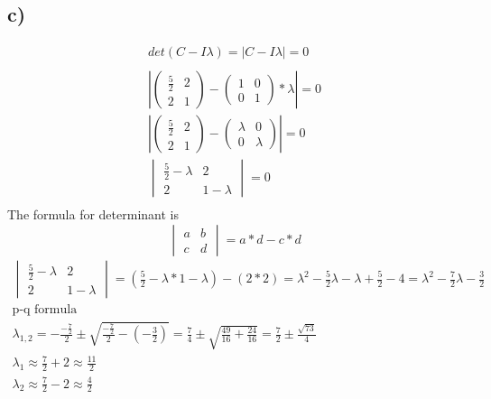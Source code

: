 \documentclass[12pt]{article}
\begin{document}
\subsection{c)}
\begin{gather*}
    det(C - I\lambda) = |C - I\lambda |= 0  \\
    \\
    \left|
    \begin{pmatrix}
        \frac{5}{2} & 2 \\
        2 & 1 
    \end{pmatrix}
    -
    \begin{pmatrix}
        1 & 0 \\
        0 & 1 
    \end{pmatrix}
    * \lambda \right| = 0 
\\
    \left|
    \begin{pmatrix}
        \frac{5}{2} & 2 \\
        2 & 1 
    \end{pmatrix}
    -
    \begin{pmatrix}
        \lambda & 0 \\
        0 & \lambda 
    \end{pmatrix}
    \right| = 0 
    \\
    \begin{vmatrix}
        \frac{5}{2} - \lambda & 2 \\
        2 & 1 -\lambda
    \end{vmatrix}
    = 0 \\
\end{gather*}
The formula for determinant is $$ 
\begin{vmatrix}
    a & b \\
    c & d 
\end{vmatrix}
= a * d - c * d $$
\begin{gather*}
    \begin{vmatrix}
        \frac{5}{2} - \lambda & 2 \\
        2 & 1 -\lambda
    \end{vmatrix}
    =(\frac{5}{2} - \lambda * 1 - \lambda) - (2 * 2) =\lambda^2 - \frac{5}{2}\lambda - \lambda + \frac{5}{2} - 4 =  \lambda^2 -\frac{7}{2}\lambda -\frac{3}{2} \\
    \text{p-q formula} \\
    \lambda_{1,2} =  -\frac{-\frac{7}{2}}{2} \pm \sqrt{\frac{-\frac{7}{2}}{2} - (-\frac{3}{2})} = \frac{7}{4} \pm \sqrt{\frac{49}{16}+ \frac{24}{16}} = \frac{7}{2} \pm \frac{\sqrt{73}}{4} \\
    \lambda_1 \approx \frac{7}{2} + 2 \approx \frac{11}{2} \\
    \lambda_2 \approx \frac{7}{2} - 2 \approx \frac{4}{2} 
\end{gather*}
\end{document}
